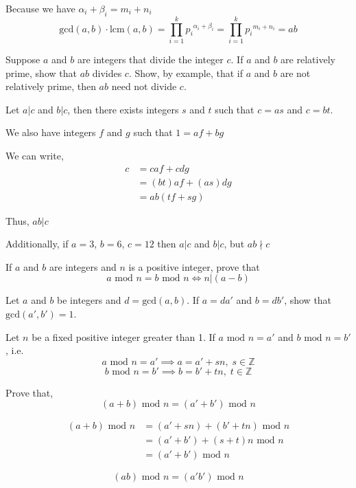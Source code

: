 \documentclass[11pt,largemargins]{homework}
\begin{document}
\quad Because we have $\alpha_i + \beta_i = m_i + n_i$
$$\text{gcd}(a,b)\cdot\text{lcm}(a,b) = \prod_{i=1}^k {p_i}^{\alpha_i + \beta_i} = \prod_{i=1}^k {p_i}^{m_i + n_i} = ab$$

\question 
Suppose $a$ and $b$ are integers that divide the integer $c$. If $a$ and $b$ are relatively prime, show that $ab$ divides $c$. 
Show, by example, that if $a$ and $b$ are not relatively prime, then $ab$ need not divide $c$. 

\quad Let $a|c$ and $b|c$, then there exists integers $s$ and $t$ such that $c = as$ and $c = bt$.

\quad We also have integers $f$ and $g$ such that $1= af + bg$

\quad We can write,
\begin{align*}
    c &= caf + cdg\\
      &= (bt)af + (as)dg\\
      &= ab(tf+sg)
\end{align*}

\quad Thus, $ab | c$

\quad Additionally, if $a=3$, $b=6$, $c=12$ then $a|c$ and $b|c$, but $ab\nmid c$

\question 
If $a$ and $b$ are integers and $n$ is a positive integer, prove that 
$$a \text{ mod } n = b \text{ mod } n \iff n | (a-b)$$

\question 
Let $a$ and $b$ be integers and $d = \text{gcd}(a,b)$. If $a=da'$ and $b=db'$, show that $\text{gcd}(a',b')=1$.

\question 
Let $n$ be a fixed positive integer greater than 1. If $a\text{ mod }n=a'$ and $b\text{ mod }n=b'$, i.e. 
$$a\text{ mod }n=a' \implies a=a'+sn, \;s\in\mathbb{Z}$$
$$b\text{ mod }n=b' \implies b=b'+tn, \;t\in\mathbb{Z}$$

Prove that,
\begin{equation}\tag{0.11a}
    (a+b)\text{ mod }n = (a'+b')\text{ mod }n 
\end{equation}

\begin{align*}
    (a+b)\text{ mod }n &= (a'+sn) + (b'+tn) \text{ mod }n\\
                     &= (a'+b') + (s+t)n\text{ mod }n\\
                     &= (a'+b')\text{ mod }n 
\end{align*}

\begin{equation}\tag{0.11b}
    (a b)\text{ mod }n = (a' b')\text{ mod }n 
\end{equation}
\end{document}
